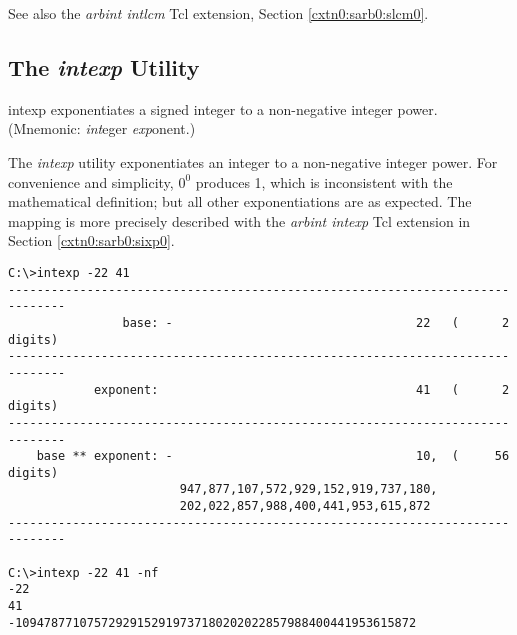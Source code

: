 \begin{dosutilcommandseealso}
See also the \emph{arbint intlcm} Tcl extension, 
Section \cxtnzeroxrefhyphen{}\ref{cxtn0:sarb0:slcm0}.
\end{dosutilcommandseealso}


\subsection{The \emph{intexp} Utility}
\label{cdcm0:sali0:sixp0}

\begin{dosutilcommandname}{intexp}%
exponentiates a signed integer to a non-negative integer
power.  (Mnemonic:  \emph{int}eger
\emph{exp}onent.)
\end{dosutilcommandname}

\begin{dosutilcommandsynopsis}
\end{dosutilcommandsynopsis}

\begin{dosutilcommanddescription}
The \emph{intexp} utility exponentiates an integer to a non-negative
integer power.  For convenience and simplicity, $0^0$ produces 1,
which is inconsistent with the mathematical definition; but all other
exponentiations are as expected.  The mapping is more precisely described
with the \emph{arbint intexp} Tcl extension in 
Section \cxtnzeroxrefhyphen{}\ref{cxtn0:sarb0:sixp0}.
\end{dosutilcommanddescription}

\begin{dosutilcommandsampleinvocations}
\begin{scriptsize}
\begin{verbatim}
C:\>intexp -22 41
------------------------------------------------------------------------------
                base: -                                  22   (      2 digits)
------------------------------------------------------------------------------
            exponent:                                    41   (      2 digits)
------------------------------------------------------------------------------
    base ** exponent: -                                  10,  (     56 digits)
                        947,877,107,572,929,152,919,737,180,
                        202,022,857,988,400,441,953,615,872
------------------------------------------------------------------------------

C:\>intexp -22 41 -nf
-22
41
-10947877107572929152919737180202022857988400441953615872
\end{verbatim}
\end{scriptsize}
\end{dosutilcommandsampleinvocations}

